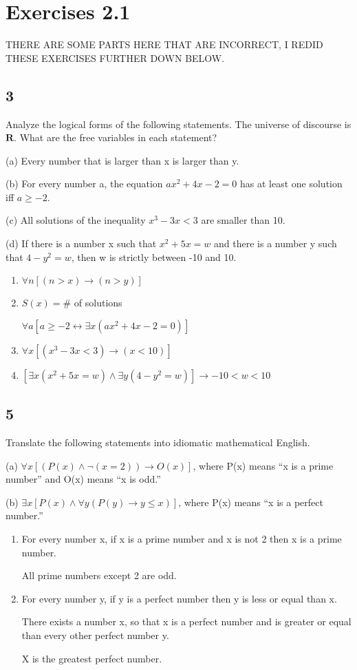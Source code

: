 \documentclass{article}
\begin{document}
\section{Exercises 2.1}
THERE ARE SOME PARTS HERE THAT ARE INCORRECT, I REDID THESE EXERCISES FURTHER DOWN BELOW.
\subsection{3}
Analyze the logical forms of the following statements. The universe
of discourse is $\mathbf{R}$. What are the free variables in each statement?

(a) Every number that is larger than x is larger than y.

(b) For every number a, the equation $ax^2 + 4x - 2 = 0$ has at least one
solution iff $a \geq -2$.

(c) All solutions of the inequality $x^3- 3x < 3$ are smaller than 10.
 
(d) If there is a number x such that $x^2 + 5x = w$ and there is a number y
such that $4 - y^2= w$, then w is strictly between -10 and 10.
\begin{enumerate}[label=(\alph*)]
    \item 
    $\forall n[(n > x) \rightarrow (n > y)]$ 
    \item
    $S(x)= \#$ of solutions
    
    $\forall a [a \geq -2 \leftrightarrow \exists x (ax^2 + 4x -2 =0)]$
    \item
    $\forall x[( x^3-3x <3)\rightarrow (x<10)]$
    
    \item
    $[\exists x(x^2 + 5x = w) \land \exists y(4 - y^2= w)]\rightarrow -10< w <10$
\end{enumerate}
\subsection{5}
Translate the following statements into idiomatic mathematical
English.

(a) $\forall x[(P(x) \land \neg(x= 2)) \rightarrow O(x)]$, where P(x) means “x is a prime
number” and O(x) means “x is odd.”

(b) $\exists x[P(x) \land \forall y(P(y) \rightarrow y \leq x)]$, where P(x) means “x is a perfect
number.”
\begin{enumerate}[label=(\alph*)]
    \item 
    For every number x, if x is a prime number and x is not 2 then x is a prime number.
    
    All prime numbers except 2 are odd.
    \item
    For every number y, if y is a perfect number then y is less or equal than x.
    
    There exists a number x, so that x is a perfect number and is greater or equal than every other perfect number y.
    
    X is the greatest perfect number.
\end{enumerate}
\end{document}
